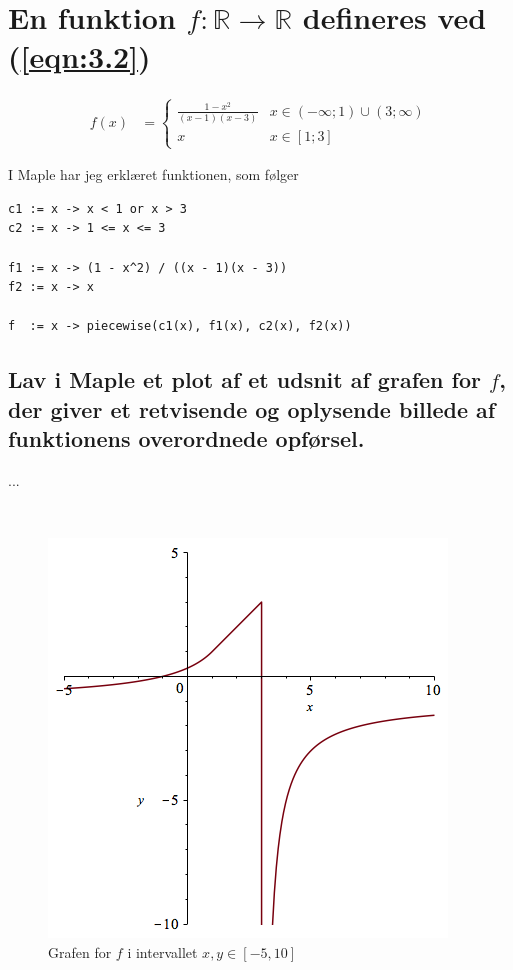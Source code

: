 \documentclass[11pt,a4paper]{article}
\newcommand{\eqnref}[1]{(\ref{eqn:#1})}
\begin{document}
\section
{
    \mdseries
    En funktion $f : \mathbb{R} \rightarrow \mathbb{R}$ defineres ved
    \eqnref{3.2}
}
\begin{align}
    f(x) &=
    \begin{cases}
        \frac{1 - x^2}{(x -1)(x - 3)} &x \in (-\infty;1) \cup (3;\infty) \\
        x &x \in [1;3]
    \end{cases}
    \label{eqn:3.2}
\end{align}

I Maple har jeg erklæret funktionen, som følger
\begin{lstlisting}
c1 := x -> x < 1 or x > 3
c2 := x -> 1 <= x <= 3

f1 := x -> (1 - x^2) / ((x - 1)(x - 3))
f2 := x -> x

f  := x -> piecewise(c1(x), f1(x), c2(x), f2(x))
\end{lstlisting}

\subsection
{
    \mdseries
    Lav i Maple et plot af et udsnit af grafen for $f$, der giver et
    retvisende og oplysende billede af funktionens overordnede opførsel.
}
\begin{multicols}{2}
    ...

    \vfill{\ }\columnbreak

    \begin{figure}[H]
        \includegraphics[scale=0.5]{figures/3-2a-1.png}
        \caption{Grafen for $f$ i intervallet $x,y \in [-5,10]$}
        \label{fig:3.2a-1}
    \end{figure}

\end{multicols}
\end{document}
